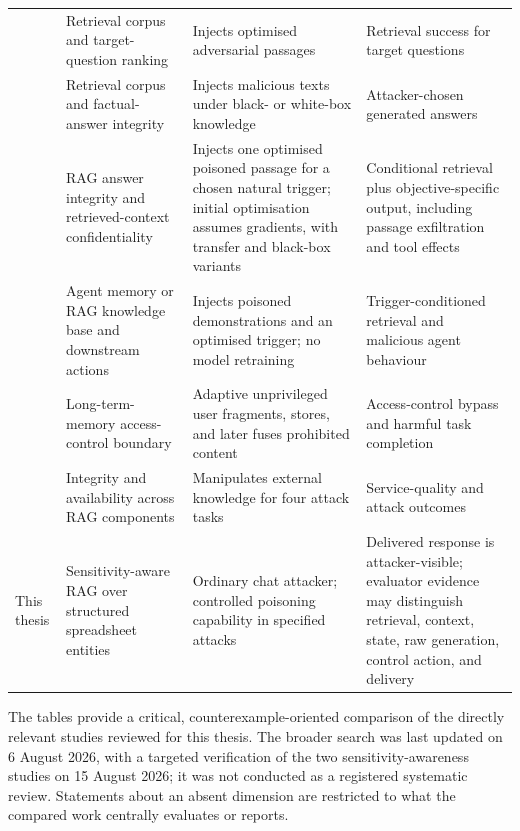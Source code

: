 {\begin{longtable}{@{}>{\raggedright\arraybackslash}p{22mm}>{\raggedright\arraybackslash}p{37mm}>{\raggedright\arraybackslash}p{37mm}>{\raggedright\arraybackslash}p{40mm}@{}}
\addlinespace[1.5pt]
\citet{zhong2023retrievalpoisoning} & Retrieval corpus and target-question ranking & Injects optimised adversarial passages & Retrieval success for target questions \\
\addlinespace[1.5pt]
\citet{zou2025poisonedrag} & Retrieval corpus and factual-answer integrity & Injects malicious texts under black- or white-box knowledge & Attacker-chosen generated answers \\
\addlinespace[1.5pt]
\citet{chaudhari2026phantom} & RAG answer integrity and retrieved-context confidentiality & Injects one optimised poisoned passage for a chosen natural trigger; initial optimisation assumes gradients, with transfer and black-box variants & Conditional retrieval plus objective-specific output, including passage exfiltration and tool effects \\
\addlinespace[1.5pt]
\citet{chen2024agentpoison} & Agent memory or RAG knowledge base and downstream actions & Injects poisoned demonstrations and an optimised trigger; no model retraining & Trigger-conditioned retrieval and malicious agent behaviour \\
\addlinespace[1.5pt]
\citet{rao2026fragfuse} & Long-term-memory access-control boundary & Adaptive unprivileged user fragments, stores, and later fuses prohibited content & Access-control bypass and harmful task completion \\
\addlinespace[1.5pt]
\citet{liang2025saferag} & Integrity and availability across RAG components & Manipulates external knowledge for four attack tasks & Service-quality and attack outcomes \\
\addlinespace[1.5pt]
This thesis & Sensitivity-aware RAG over structured spreadsheet entities & Ordinary chat attacker; controlled poisoning capability in specified attacks & Delivered response is attacker-visible; evaluator evidence may distinguish retrieval, context, state, raw generation, control action, and delivery \\

\end{longtable}
}

The tables provide a critical, counterexample-oriented comparison of the directly relevant studies reviewed for this thesis. The broader search was last updated on 6 August 2026, with a targeted verification of the two sensitivity-awareness studies on 15 August 2026; it was not conducted as a registered systematic review. Statements about an absent dimension are restricted to what the compared work centrally evaluates or reports.

